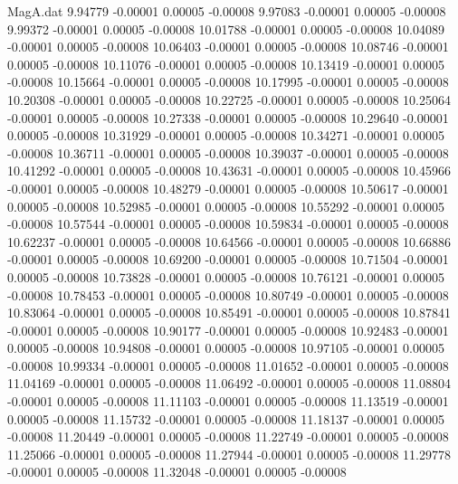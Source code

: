 \begin{filecontents}{MagA.dat}
   9.94779   -0.00001    0.00005   -0.00008
   9.97083   -0.00001    0.00005   -0.00008
   9.99372   -0.00001    0.00005   -0.00008
  10.01788   -0.00001    0.00005   -0.00008
  10.04089   -0.00001    0.00005   -0.00008
  10.06403   -0.00001    0.00005   -0.00008
  10.08746   -0.00001    0.00005   -0.00008
  10.11076   -0.00001    0.00005   -0.00008
  10.13419   -0.00001    0.00005   -0.00008
  10.15664   -0.00001    0.00005   -0.00008
  10.17995   -0.00001    0.00005   -0.00008
  10.20308   -0.00001    0.00005   -0.00008
  10.22725   -0.00001    0.00005   -0.00008
  10.25064   -0.00001    0.00005   -0.00008
  10.27338   -0.00001    0.00005   -0.00008
  10.29640   -0.00001    0.00005   -0.00008
  10.31929   -0.00001    0.00005   -0.00008
  10.34271   -0.00001    0.00005   -0.00008
  10.36711   -0.00001    0.00005   -0.00008
  10.39037   -0.00001    0.00005   -0.00008
  10.41292   -0.00001    0.00005   -0.00008
  10.43631   -0.00001    0.00005   -0.00008
  10.45966   -0.00001    0.00005   -0.00008
  10.48279   -0.00001    0.00005   -0.00008
  10.50617   -0.00001    0.00005   -0.00008
  10.52985   -0.00001    0.00005   -0.00008
  10.55292   -0.00001    0.00005   -0.00008
  10.57544   -0.00001    0.00005   -0.00008
  10.59834   -0.00001    0.00005   -0.00008
  10.62237   -0.00001    0.00005   -0.00008
  10.64566   -0.00001    0.00005   -0.00008
  10.66886   -0.00001    0.00005   -0.00008
  10.69200   -0.00001    0.00005   -0.00008
  10.71504   -0.00001    0.00005   -0.00008
  10.73828   -0.00001    0.00005   -0.00008
  10.76121   -0.00001    0.00005   -0.00008
  10.78453   -0.00001    0.00005   -0.00008
  10.80749   -0.00001    0.00005   -0.00008
  10.83064   -0.00001    0.00005   -0.00008
  10.85491   -0.00001    0.00005   -0.00008
  10.87841   -0.00001    0.00005   -0.00008
  10.90177   -0.00001    0.00005   -0.00008
  10.92483   -0.00001    0.00005   -0.00008
  10.94808   -0.00001    0.00005   -0.00008
  10.97105   -0.00001    0.00005   -0.00008
  10.99334   -0.00001    0.00005   -0.00008
  11.01652   -0.00001    0.00005   -0.00008
  11.04169   -0.00001    0.00005   -0.00008
  11.06492   -0.00001    0.00005   -0.00008
  11.08804   -0.00001    0.00005   -0.00008
  11.11103   -0.00001    0.00005   -0.00008
  11.13519   -0.00001    0.00005   -0.00008
  11.15732   -0.00001    0.00005   -0.00008
  11.18137   -0.00001    0.00005   -0.00008
  11.20449   -0.00001    0.00005   -0.00008
  11.22749   -0.00001    0.00005   -0.00008
  11.25066   -0.00001    0.00005   -0.00008
  11.27944   -0.00001    0.00005   -0.00008
  11.29778   -0.00001    0.00005   -0.00008
  11.32048   -0.00001    0.00005   -0.00008

\end{filecontents}
